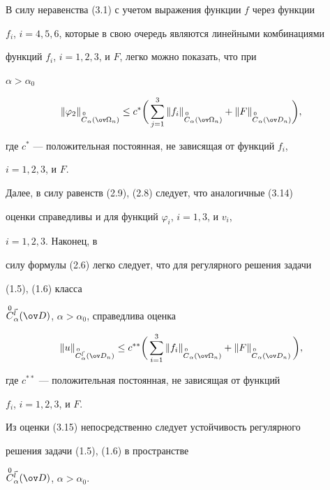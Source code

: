 В силу неравенства (3.1) с учетом выражения функции $f$ через функции


$f_i$, $i=4,5,6$, которые в свою очередь являются линейными комбинациями


функций $f_i$, $i=1,2,3$, и $F$, легко можно показать, что при


$\alpha>\alpha_0$


\begin{equation}


\|\varphi_2\|_{\OC_\alpha(\ov\Omega_n)}\le c^*


\biggl(\,\sum^3_{j=1}\|f_i\|_{\OC_\alpha(\ov\Omega_n)}+


\|F\|_{\OC_\alpha(\ov D_n)}\biggr),


\end{equation}


где $c^*$ --- положительная постоянная, не зависящая от функций $f_i$,


$i=1,2,3$, и $F$.





Далее, в силу равенств (2.9), (2.8) следует, что аналогичные (3.14)


оценки справедливы и для функций $\varphi_i$, $i=1,3$, и $v_i$,


$i=1,2,3$. Наконец, в


силу формулы (2.6) легко следует, что для регулярного решения задачи


(1.5), (1.6) класса


$\OC^{\Vec l}_\alpha(\ov D)$, $\alpha>\alpha_0$, справедлива оценка


\begin{equation}


\|u\|_{\OC^{\Vec l}_\alpha(\ov D_n)}\le c^{**}


\biggl(\,\sum^3_{i=1}\|f_i\|_{\OC_\alpha(\ov\Omega_n)}


+\|F\|_{\OC_\alpha(\ov D_n)}\,\biggr),


\end{equation}


где $c^{**}$ --- положительная постоянная, не зависящая от функций


$f_i$, $i=1,2,3$, и $F$.





Из оценки (3.15) непосредственно следует устойчивость регулярного


решения задачи (1.5), (1.6) в пространстве


$\OC^{\Vec l}_\alpha(\ov D)$, $\alpha>\alpha_0$.








